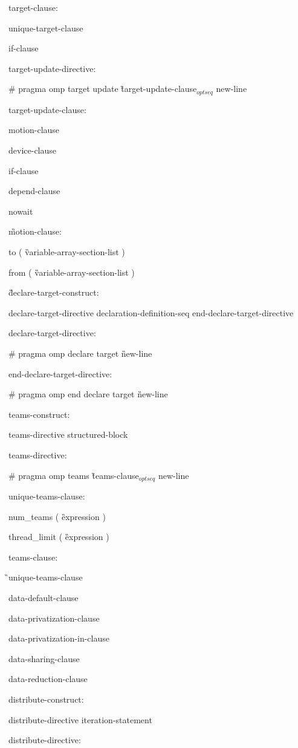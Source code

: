 {target-clause:

\I unique-target-clause

\I if-clause

target-update-directive:

\C\I \# pragma omp target update \G target-update-clause$_{optseq}$ new-line

target-update-clause:

\I motion-clause

\I device-clause

\I if-clause

\I depend-clause

\C\I nowait

\G motion-clause:

\C\I to ( \G variable-array-section-list \C )

\C\I from ( \G variable-array-section-list \C )

\G declare-target-construct:

\I declare-target-directive declaration-definition-seq end-declare-target-directive

declare-target-directive:

\C\I \# pragma omp declare target \G new-line

end-declare-target-directive:

\C\I \# pragma omp end declare target \G new-line

teams-construct:

\I teams-directive structured-block

teams-directive:

\C\I \# pragma omp teams \G teams-clause$_{optseq}$ new-line

unique-teams-clause:

\C\I num\_teams ( \G expression \C )

\C\I thread\_limit ( \G expression \C )

teams-clause:

\G\I unique-teams-clause

\I data-default-clause

\I data-privatization-clause

\I data-privatization-in-clause

\I data-sharing-clause

\I data-reduction-clause

distribute-construct:

\I distribute-directive iteration-statement

distribute-directive:

}
